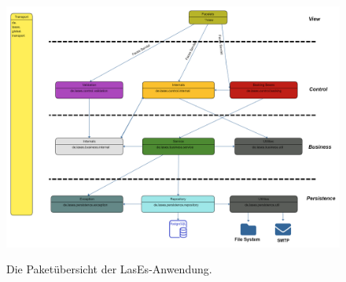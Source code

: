 \subsubsection{}
\begin{figure}[H]
    \centering
    \includegraphics[width=0.8\linewidth]{graphics/Paketdiagramm10.0}\label{arch:pakdia}
    \caption{Die Paketübersicht der LasEs-Anwendung.}
\end{figure}